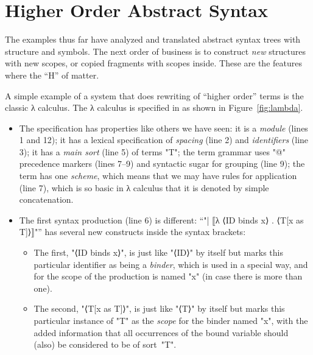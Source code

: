 \documentclass[11pt]{article} %
\begin{document}
\section{Higher Order Abstract Syntax}
\label{sec:hoas}

The examples thus far have analyzed and translated abstract syntax trees with structure and
symbols. The next order of business is to construct \emph{new} structures with new scopes, or copied
fragments with scopes inside. These are the features where the ``H'' of \HAX matter.

\begin{example}
  A simple example of a system that does rewriting of ``higher order'' terms is the classic λ
  calculus. The λ calculus is specified in \HAX as shown in Figure~\ref{fig:lambda}.
  \begin{itemize}

  \item The specification has properties like others we have seen: it is a \emph{module} (lines 1
    and 12); it has a lexical specification of \emph{spacing} (line 2) and \emph{identifiers} (line
    3); it has a \emph{main sort} (line 5) of terms "T"; the term grammar uses "@" precedence
    markers (lines 7--9) and syntactic sugar for grouping (line 9); the term has one \emph{scheme},
    which means that we may have rules for application (line 7), which is so basic in λ calculus
    that it is denoted by simple concatenation.

  \item The first syntax production (line 6) is different:
    ``"| ⟦λ ⟨ID binds x⟩ . ⟨T[x as T]⟩⟧"''
    has several new constructs inside the syntax brackets:
    \begin{itemize}

    \item The first, "⟨ID binds x⟩", is just like "⟨ID⟩" by itself but marks this particular
      identifier as being a \emph{binder}, which is used in a special way, and for the scope of the
      production is named "x" (in case there is more than one).

    \item The second, "⟨T[x as T]⟩", is just like "⟨T⟩" by itself but marks this particular instance
      of "T" as the \emph{scope} for the binder named "x", with the added information that all
      occurrences of the bound variable should (also) be considered to be of sort~"T".

    \end{itemize}


\end{itemize}
\end{example}
\end{document}
